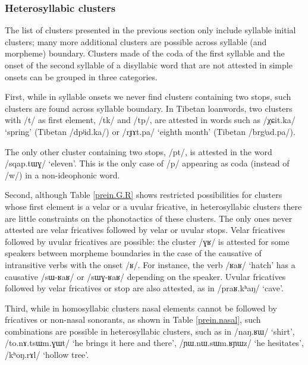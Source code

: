 \documentclass[oldfontcommands,oneside,a4paper,11pt]{article}
\newcommand{\ipa}[1]{{\phon/#1/}} %
\begin{document}
 
 
 
 \subsubsection{Heterosyllabic clusters} \label{sec:heterosyllabic.clusters}
 
 The list of clusters presented in the previous section only include syllable initial clusters; many more additional clusters are possible across syllable (and morpheme) boundary. Clusters made of the coda of the first syllable and the onset of the second syllable of a disyllabic word that are not attested in simple onsets can be grouped in three categories.
 
 First, while in syllable onsets we never find clusters containing two stops, such clusters are found across syllable boundary. In Tibetan loanwords, two clusters with \ipa{t} as first element,  \ipa{tk} and \ipa{tp}, are attested in words such as \ipa{χɕit.ka} `spring' (Tibetan \ipa{dpʲid.ka}) or \ipa{rɟɤt.pa} `eighth month' (Tibetan \ipa{brgʲad.pa}). 
 
 The only  other cluster containing two stops, \ipa{pt}, is attested in the word  \ipa{sqap.tɯɣ} `eleven'. This is the only case of \ipa{p} appearing as coda (instead of \ipa{w}) in a non-ideophonic  word.
 
 Second, although Table \ref{prein.G.R} shows restricted possibilities for clusters whose first element is a velar or a uvular fricative, in heterosyllabic clusters there are little constraints on the phonotactics of these clusters. The only ones never attested are velar fricatives followed by velar or uvular stops. Velar fricatives followed by uvular fricatives are possible:  the cluster \ipa{ɣʁ} is attested for some speakers between morpheme boundaries in the case of the causative of intransitive verbs with the onset \ipa{ʁ}. For instance, the verb \ipa{ʁaʁ} `hatch' has a causative \ipa{sɯ-ʁaʁ} or \ipa{sɯɣ-ʁaʁ} depending on the speaker. Uvular fricatives followed by velar fricatives or stop are also attested, as in \ipa{praʁ.kʰaŋ} `cave'.
 
Third, while in homosyllabic clusters nasal elements cannot be followed by fricatives or non-nasal sonorants, as shown in Table \ref{prein.nasal}, such combinations are possible in heterosyllabic clusters, such as in \ipa{naŋ.ʁɯ} `shirt', \ipa{to.nɤ.tsɯm.ɣɯt} `he brings it here and there', \ipa{ɲɯ.nɯ.sɯm.ʁɲɯz} `he hesitates', \ipa{kʰoŋ.rɤl} `hollow tree'.
\end{document}
